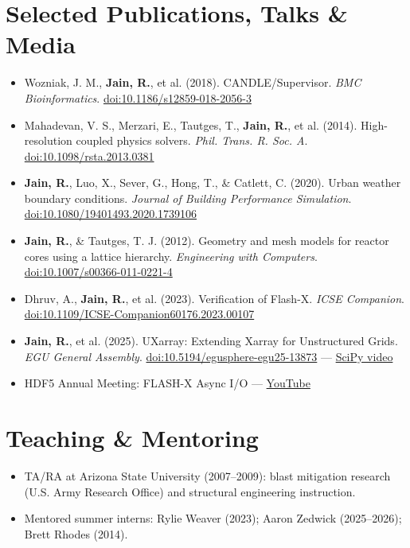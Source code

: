 \documentclass[10pt,letterpaper]{article}
\begin{document}
\section*{Selected Publications, Talks \& Media}
\begin{itemize}[leftmargin=*, itemsep=1pt]
  \item Wozniak, J. M., \textbf{Jain, R.}, et al. (2018). CANDLE/Supervisor. \textit{BMC Bioinformatics}. \href{https://doi.org/10.1186/s12859-018-2056-3}{doi:10.1186/s12859-018-2056-3}
  \item Mahadevan, V. S., Merzari, E., Tautges, T., \textbf{Jain, R.}, et al. (2014). High-resolution coupled physics solvers. \textit{Phil. Trans. R. Soc. A}. \href{https://doi.org/10.1098/rsta.2013.0381}{doi:10.1098/rsta.2013.0381}
  \item \textbf{Jain, R.}, Luo, X., Sever, G., Hong, T., \& Catlett, C. (2020). Urban weather boundary conditions. \textit{Journal of Building Performance Simulation}. \href{https://doi.org/10.1080/19401493.2020.1739106}{doi:10.1080/19401493.2020.1739106}
  \item \textbf{Jain, R.}, \& Tautges, T. J. (2012). Geometry and mesh models for reactor cores using a lattice hierarchy. \textit{Engineering with Computers}. \href{https://doi.org/10.1007/s00366-011-0221-4}{doi:10.1007/s00366-011-0221-4}
  \item Dhruv, A., \textbf{Jain, R.}, et al. (2023). Verification of Flash-X. \textit{ICSE Companion}. \href{https://doi.org/10.1109/ICSE-Companion60176.2023.00107}{doi:10.1109/ICSE-Companion60176.2023.00107}
  \item \textbf{Jain, R.}, et al. (2025). UXarray: Extending Xarray for Unstructured Grids. \textit{EGU General Assembly}. \href{https://doi.org/10.5194/egusphere-egu25-13873}{doi:10.5194/egusphere-egu25-13873} — \href{https://www.youtube.com/watch?v=qwqJeOO8m6A&t=545s}{SciPy video}
  \item HDF5 Annual Meeting: FLASH-X Async I/O — \href{https://www.youtube.com/watch?v=MuifQ7lHRR8&t=176s}{YouTube}
\end{itemize}

\section*{Teaching \& Mentoring}
\begin{itemize}[leftmargin=*, itemsep=1pt]
  \item TA/RA at Arizona State University (2007--2009): blast mitigation research (U.S. Army Research Office) and structural engineering instruction.
  \item Mentored summer interns: Rylie Weaver (2023); Aaron Zedwick (2025--2026); Brett Rhodes (2014).
\end{itemize}
\end{document}
